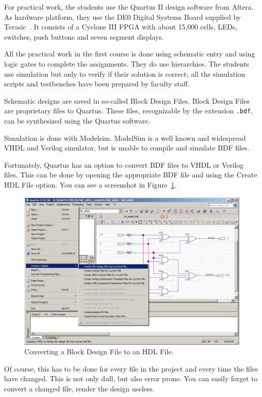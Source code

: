\documentclass[11pt,a4paper,final,oneside,titlepage,fleqn]{article}
\begin{document}
For practical work, the students use the Quartus II design software from Altera.
As hardware platform, they use the DE0 Digital Systems Board supplied
by Terasic~\cite{web/terasic_de0}. It consists of a Cyclone III FPGA with about
15,000 cells, LEDs, switches, push buttons and seven segment displays. 

All the practical work in the first course is done using schematic entry and
using logic gates to complete the assignments. They do use hierarchies.
The students use simulation
but only to verify if their solution is correct; all the simulation scripts
and testbenches have been prepared by faculty staff.

Schematic designs are saved in so-called Block Design Files. Block Design Files
are proprietary files to Quartus. These files, recognizable by the extension
\texttt{.bdf}, can be synthesized using the Quartus software.

Simulation is done with Modelsim. ModelSim is a well known and widespread VHDL
and Verilog simulator, but is unable to compile and simulate BDF files.

Fortunately, Quartus has an option to convert BDF files to VHDL or Verilog files.
This can be done by opening the appropriate BDF file and using the Create HDL File
option. You can see a screenshot in Figure~\ref{010convertbdftohdl}.

\begin{figure}[!ht]
  \centering
  \includegraphics[scale=0.44]{010convertbdftohdl.png}
  \caption{Converting a Block Design File to an HDL File.}
  \label{010convertbdftohdl}
\end{figure}

Of course, this has to be done for every file in the project and every time
the files have changed. This is not only dull, but also error prone. You can
easily forget to convert a changed file, render the design useless.
\end{document}
